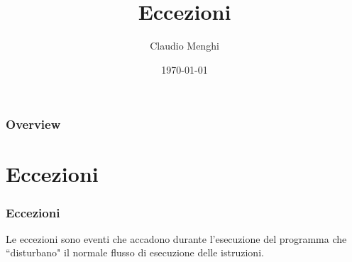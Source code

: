 \documentclass{beamer}
\title[Eccezioni]{Eccezioni} %
\author{Claudio Menghi} %
\institute[Polimi] %
{
Politecnico di Milano \\ %
\medskip
\textit{claudio.menghi@polimi.it} %
}
\date{\today} %
\begin{document}
\begin{frame}
\titlepage %
\end{frame}

\begin{frame}
\frametitle{Overview} %
\tableofcontents %
\end{frame}





\section{Eccezioni}

\begin{frame}
\frametitle{Eccezioni}
\begin{framed}
Le eccezioni sono eventi che accadono durante l'esecuzione del programma  che ``disturbano" il normale flusso di esecuzione delle istruzioni. 
\end{framed}
\end{frame}
\end{document}
